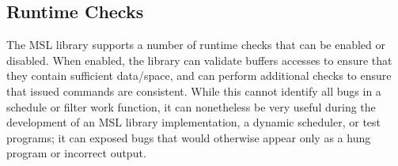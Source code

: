 \subsection{Runtime Checks}

The MSL library supports a number of runtime checks that can be
enabled or disabled. When enabled, the library can validate buffers
accesses to ensure that they contain sufficient data/space, and
can perform additional checks to ensure that issued commands are
consistent. While this cannot identify all bugs in a schedule or
filter work function, it can nonetheless be very useful during the
development of an MSL library implementation, a dynamic scheduler, or
 test programs;
it can exposed bugs that would otherwise appear only as a hung
program or incorrect output.


